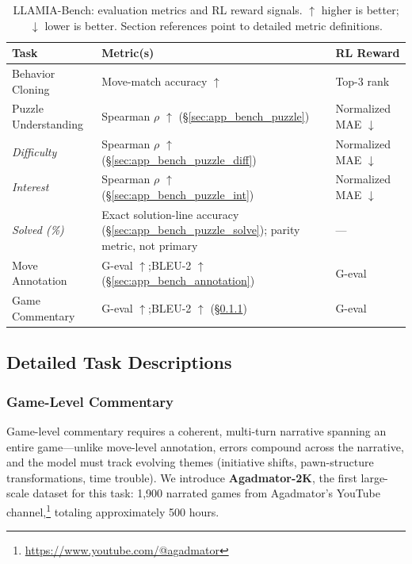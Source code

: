 \begin{table}[ht]
\centering
\small
\setlength{\tabcolsep}{5pt}
\renewcommand{\arraystretch}{1.3}
\caption{LLAMIA-Bench: evaluation metrics and RL reward signals. $\uparrow$ higher is better; $\downarrow$ lower is better. Section references point to detailed metric definitions.}
\label{tab:bench_metrics}
\vspace{4pt}
\begin{tabular}{p{3.5cm} p{5.2cm} p{3.4cm}}
\toprule
\textbf{Task} & \textbf{Metric(s)} & \textbf{RL Reward} \\
\midrule
Behavior Cloning       & Move-match accuracy $\uparrow$                                              & Top-3 rank \\
Puzzle Understanding   & Spearman $\rho$ $\uparrow$ (\S\ref{sec:app_bench_puzzle})                   & Normalized MAE $\downarrow$ \\
{\scriptsize\quad\emph{Difficulty}} & {\scriptsize Spearman $\rho$ $\uparrow$ (\S\ref{sec:app_bench_puzzle_diff})} & {\scriptsize Normalized MAE $\downarrow$} \\
{\scriptsize\quad\emph{Interest}}   & {\scriptsize Spearman $\rho$ $\uparrow$ (\S\ref{sec:app_bench_puzzle_int})}  & {\scriptsize Normalized MAE $\downarrow$} \\
{\scriptsize\quad\emph{Solved (\%)}} & {\scriptsize Exact solution-line accuracy (\S\ref{sec:app_bench_puzzle_solve}); parity metric, not primary} & {\scriptsize ---} \\
Move Annotation        & G-eval $\uparrow$;\enspace BLEU-2 $\uparrow$ (\S\ref{sec:app_bench_annotation}) & G-eval \\
Game Commentary        & G-eval $\uparrow$;\enspace BLEU-2 $\uparrow$ (\S\ref{sec:app_bench_commentary}) & G-eval \\
\bottomrule
\end{tabular}
\end{table}

\subsection{Detailed Task Descriptions}
\label{sec:app_bench_tasks}

\subsubsection{Game-Level Commentary}
\label{sec:app_bench_commentary}

Game-level commentary requires a coherent, multi-turn narrative spanning an entire game---unlike move-level annotation, errors compound across the narrative, and the model must track evolving themes (initiative shifts, pawn-structure transformations, time trouble). We introduce \textbf{Agadmator-2K}, the first large-scale dataset for this task: 1,900 narrated games from Agadmator's YouTube channel,\footnote{\url{https://www.youtube.com/@agadmator}} totaling approximately 500 hours.

